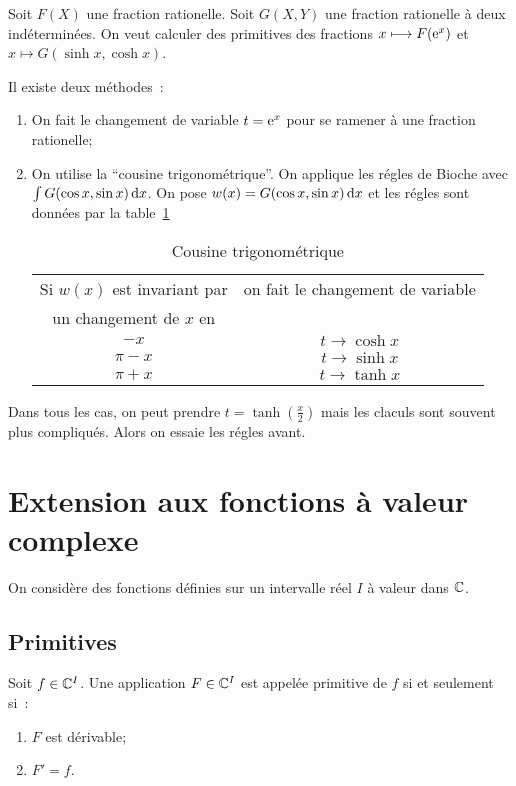 Soit $F(X)$ une fraction rationelle. Soit $G(X,Y)$ une fraction rationelle à deux indéterminées. On veut calculer des primitives des fractions $x \longmapsto F(\operatorname{e}^x)$ et $x \longmapsto G(\sinh x,\cosh x)$.

Il existe deux méthodes~:
\begin{enumerate}
\item On fait le changement de variable $t=\operatorname{e}^x$ pour se ramener à une fraction rationelle;
\item On utilise la ``cousine trigonométrique''. On applique les régles de Bioche avec $\int G(\cos x,\sin x)\mathop{}\mathopen{}\mathrm{d} x$. On pose $w(x) = G(\cos x,\sin x) \mathop{}\mathopen{}\mathrm{d} x$ et les régles sont données par la table~\ref{tab:cousinetrigo}

\begin{table}[!h]
  \centering
  \begin{tabular}{|c|c|}\hline
    Si $w(x)$ est invariant par & on fait le changement de variable \\
    un changement de $x$ en &  \\ \hline
    $-x$ & $t \to \cosh x$\\
    $\pi-x$ & $t \to \sinh x$\\
    $\pi+x$ & $t \to \tanh x$\\
  \hline\end{tabular}
  \caption{Cousine trigonométrique}
  \label{tab:cousinetrigo}
\end{table}
\end{enumerate}

Dans tous les cas, on peut prendre $t=\tanh\left(\frac{x}{2}\right)$ mais les claculs sont souvent plus compliqués. Alors on essaie les régles avant.

\section{Extension aux fonctions à valeur complexe}

On considère des fonctions définies sur un intervalle réel $I$ à valeur dans $\mathbb{C}$.

\subsection{Primitives}

\begin{defdef}
  Soit $f \in \mathbb{C}^I$. Une application $F \in \mathbb{C}^I$ est appelée primitive de $f$ si et seulement si~:
  \begin{enumerate}
  \item $F$ est dérivable;
  \item $F'=f$.
  \end{enumerate}
\end{defdef}

